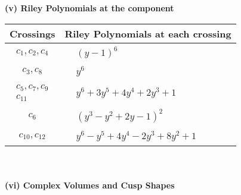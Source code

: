 \documentclass[1p]{elsarticle_modified}
\theoremstyle{definition}
\begin{document}
\newpage\renewcommand{\arraystretch}{1}
\flushleft \textbf{(v) Riley Polynomials at the component}\newline \\
\begin{tabular}{m{50pt}|m{274pt}}
Crossings & \hspace{64pt}Riley Polynomials at each crossing \\
\hline $$\begin{aligned}c_{1},c_{2},c_{4}\end{aligned}$$&$\begin{aligned}
&(y-1)^6
\end{aligned}$\\
\hline $$\begin{aligned}c_{3},c_{8}\end{aligned}$$&$\begin{aligned}
&y^6
\end{aligned}$\\
\hline $$\begin{aligned}c_{5},c_{7},c_{9}\\c_{11}\end{aligned}$$&$\begin{aligned}
&y^6+3 y^5+4 y^4+2 y^3+1
\end{aligned}$\\
\hline $$\begin{aligned}c_{6}\end{aligned}$$&$\begin{aligned}
&(y^3- y^2+2 y-1)^2
\end{aligned}$\\
\hline $$\begin{aligned}c_{10},c_{12}\end{aligned}$$&$\begin{aligned}
&y^6- y^5+4 y^4-2 y^3+8 y^2+1
\end{aligned}$\\
\hline
\end{tabular}\\~\\
\newpage\flushleft \textbf{(vi) Complex Volumes and Cusp Shapes}
\end{document}
